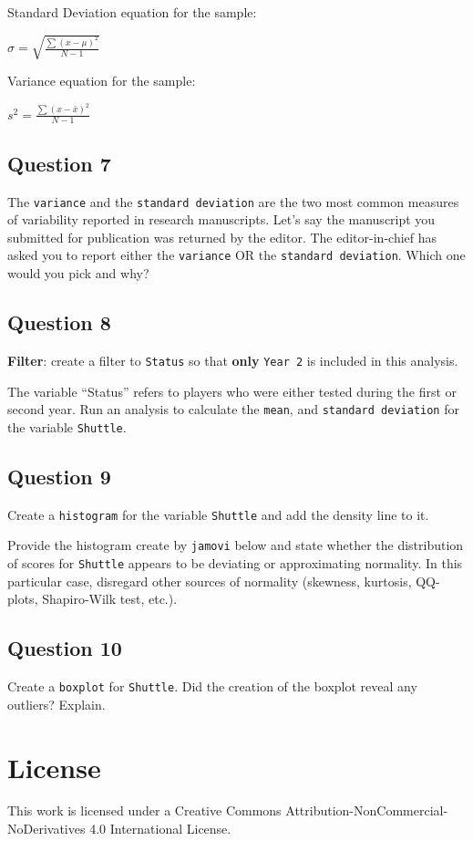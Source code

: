 \documentclass[
]{article}
\begin{document}
Standard Deviation equation for the sample:

\(\sigma = \sqrt{\frac{\sum (x - \mu)^2}{N-1}}\)

Variance equation for the sample:

\(s^2 = \frac{\sum (x - \bar{x})^2}{N - 1}\)

\hypertarget{question-7}{%
\subsection{Question 7}\label{question-7}}

The \texttt{variance} and the \texttt{standard\ deviation} are the two
most common measures of variability reported in research manuscripts.
Let's say the manuscript you submitted for publication was returned by
the editor. The editor-in-chief has asked you to report either the
\texttt{variance} OR the \texttt{standard\ deviation}. Which one would
you pick and why?

\hypertarget{question-8}{%
\subsection{Question 8}\label{question-8}}

\textbf{Filter}: create a filter to \texttt{Status} so that
\textbf{only} \texttt{Year\ 2} is included in this analysis.

The variable ``Status'' refers to players who were either tested during
the first or second year. Run an analysis to calculate the
\texttt{mean}, and \texttt{standard\ deviation} for the variable
\texttt{Shuttle}.

\hypertarget{question-9}{%
\subsection{Question 9}\label{question-9}}

Create a \texttt{histogram} for the variable \texttt{Shuttle} and add
the density line to it.

Provide the histogram create by \texttt{jamovi} below and state whether
the distribution of scores for \texttt{Shuttle} appears to be deviating
or approximating normality. In this particular case, disregard other
sources of normality (skewness, kurtosis, QQ-plots, Shapiro-Wilk test,
etc.).

\hypertarget{question-10}{%
\subsection{Question 10}\label{question-10}}

Create a \texttt{boxplot} for \texttt{Shuttle}. Did the creation of the
boxplot reveal any outliers? Explain.

\hypertarget{license}{%
\section{License}\label{license}}

This work is licensed under a Creative Commons
Attribution-NonCommercial-NoDerivatives 4.0 International License.
\end{document}
